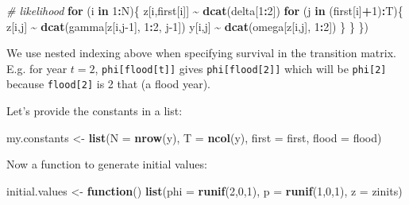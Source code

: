 \documentclass[
  12pt,
]{krantz}
\newenvironment{Shaded}{\begin{snugshade}}{\end{snugshade}}
\newcommand{\AttributeTok}[1]{\textcolor[rgb]{0.13,0.29,0.53}{#1}}
\newcommand{\CommentTok}[1]{\textcolor[rgb]{0.56,0.35,0.01}{\textit{#1}}}
\newcommand{\ControlFlowTok}[1]{\textcolor[rgb]{0.13,0.29,0.53}{\textbf{#1}}}
\newcommand{\DecValTok}[1]{\textcolor[rgb]{0.00,0.00,0.81}{#1}}
\newcommand{\FunctionTok}[1]{\textcolor[rgb]{0.13,0.29,0.53}{\textbf{#1}}}
\newcommand{\NormalTok}[1]{#1}
\newcommand{\OtherTok}[1]{\textcolor[rgb]{0.56,0.35,0.01}{#1}}
\newcommand{\SpecialCharTok}[1]{\textcolor[rgb]{0.81,0.36,0.00}{\textbf{#1}}}
\begin{document}
\begin{Shaded}
\begin{Highlighting}[]
  \CommentTok{\# likelihood}
  \ControlFlowTok{for}\NormalTok{ (i }\ControlFlowTok{in} \DecValTok{1}\SpecialCharTok{:}\NormalTok{N)\{}
\NormalTok{    z[i,first[i]] }\SpecialCharTok{\textasciitilde{}} \FunctionTok{dcat}\NormalTok{(delta[}\DecValTok{1}\SpecialCharTok{:}\DecValTok{2}\NormalTok{])}
    \ControlFlowTok{for}\NormalTok{ (j }\ControlFlowTok{in}\NormalTok{ (first[i]}\SpecialCharTok{+}\DecValTok{1}\NormalTok{)}\SpecialCharTok{:}\NormalTok{T)\{}
\NormalTok{      z[i,j] }\SpecialCharTok{\textasciitilde{}} \FunctionTok{dcat}\NormalTok{(gamma[z[i,j}\DecValTok{{-}1}\NormalTok{], }\DecValTok{1}\SpecialCharTok{:}\DecValTok{2}\NormalTok{, j}\DecValTok{{-}1}\NormalTok{])}
\NormalTok{      y[i,j] }\SpecialCharTok{\textasciitilde{}} \FunctionTok{dcat}\NormalTok{(omega[z[i,j], }\DecValTok{1}\SpecialCharTok{:}\DecValTok{2}\NormalTok{])}
\NormalTok{    \}}
\NormalTok{  \}}
\NormalTok{\})}
\end{Highlighting}
\end{Shaded}

We use nested indexing above when specifying survival in the transition matrix. E.g. for year \(t = 2\), \texttt{phi{[}flood{[}t{]}{]}} gives \texttt{phi{[}flood{[}2{]}{]}} which will be \texttt{phi{[}2{]}} because \texttt{flood{[}2{]}} is 2 that (a flood year).

Let's provide the constants in a list:

\begin{Shaded}
\begin{Highlighting}[]
\NormalTok{my.constants }\OtherTok{\textless{}{-}} \FunctionTok{list}\NormalTok{(}\AttributeTok{N =} \FunctionTok{nrow}\NormalTok{(y),}
                     \AttributeTok{T =} \FunctionTok{ncol}\NormalTok{(y),}
                     \AttributeTok{first =}\NormalTok{ first,}
                     \AttributeTok{flood =}\NormalTok{ flood)}
\end{Highlighting}
\end{Shaded}

Now a function to generate initial values:

\begin{Shaded}
\begin{Highlighting}[]
\NormalTok{initial.values }\OtherTok{\textless{}{-}} \ControlFlowTok{function}\NormalTok{() }\FunctionTok{list}\NormalTok{(}\AttributeTok{phi =} \FunctionTok{runif}\NormalTok{(}\DecValTok{2}\NormalTok{,}\DecValTok{0}\NormalTok{,}\DecValTok{1}\NormalTok{),}
                                  \AttributeTok{p =} \FunctionTok{runif}\NormalTok{(}\DecValTok{1}\NormalTok{,}\DecValTok{0}\NormalTok{,}\DecValTok{1}\NormalTok{),}
                                  \AttributeTok{z =}\NormalTok{ zinits)}
\end{Highlighting}
\end{Shaded}
\end{document}
